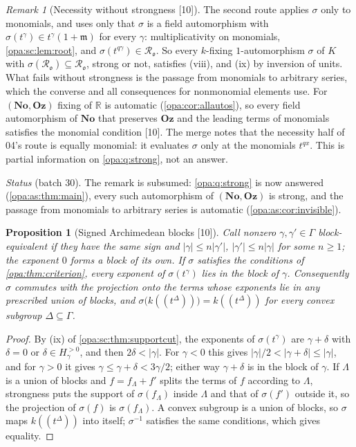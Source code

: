 \documentclass[11pt,oneside]{article}
\numberwithin{equation}{section}
\newtheorem{proposition}[proposition]{Proposition}
\theoremstyle{definition}
\theoremstyle{remark}
\newtheorem{remark}[remark]{Remark}
\newcommand{\No}{\mathbf{No}}
\newcommand{\Oz}{\mathbf{Oz}}
\newcommand{\R}{\mathbb R}
\newcommand{\oo}{\mathfrak o}
\newcommand{\Ro}{\mathcal R_{\oo}}
\newcommand{\mm}{\mathfrak m}
\newcommand{\Hahn}[2]{#1((t^{#2}))}
\newcommand{\src}[1]{\textup{\textsf{\small[#1]}}}
\begin{document}
\begin{remark}[Necessity without strongness \src{10}]\label{opa:sc:rem:nonstrong}
The second route applies $\sigma$ only to monomials, and uses only that $\sigma$
is a field automorphism with $\sigma(t^\gamma)\in t^\gamma(1+\mm)$ for every
$\gamma$: multiplicativity on monomials, \cref{opa:sc:lem:root}, and
$\sigma(t^{q\gamma})\in\Ro$. So every $k$-fixing $1$-automorphism $\sigma$ of $K$
with $\sigma(\Ro)\subseteq\Ro$, strong or not, satisfies (viii), and (ix) by
inversion of units. What fails without strongness is
the passage from monomials to arbitrary series, which the converse and all
consequences for nonmonomial elements use. For $(\No,\Oz)$ fixing of $\R$ is
automatic (\cref{opa:cor:allautos}), so every field automorphism of $\No$ that
preserves $\Oz$ and the leading terms of monomials satisfies the monomial
condition \src{10}. The merge notes that the necessity half of 04's route is
equally monomial: it evaluates $\sigma$ only at the monomials $t^{qx}$. This is
partial information on \cref{opa:q:strong}, not an answer.
\end{remark}

\emph{Status} (batch 30). The remark is subsumed: \cref{opa:q:strong} is now
answered (\cref{opa:as:thm:main}), every such automorphism of $(\No,\Oz)$ is
strong, and the passage from monomials to arbitrary series is automatic
(\cref{opa:as:cor:invisible}).

\begin{proposition}[Signed Archimedean blocks \src{10}]\label{opa:sc:prop:blocks}
Call nonzero $\gamma,\gamma'\in\Gamma$ \emph{block-equivalent} if they have the
same sign and $|\gamma|\le n|\gamma'|$, $|\gamma'|\le n|\gamma|$ for some $n\ge1$;
the exponent $0$ forms a block of its own. If $\sigma$ satisfies the conditions
of \cref{opa:thm:criterion}, every exponent of $\sigma(t^\gamma)$ lies in the block
of $\gamma$. Consequently $\sigma$ commutes with the projection onto the terms
whose exponents lie in any prescribed union of blocks, and
$\sigma\bigl(\Hahn k\Delta\bigr)=\Hahn k\Delta$ for every convex subgroup
$\Delta\subseteq\Gamma$.
\end{proposition}
\begin{proof}
By (ix) of \cref{opa:sc:thm:supportcut}, the exponents of $\sigma(t^\gamma)$
are $\gamma+\delta$ with $\delta=0$ or
$\delta\in H_\gamma^{>0}$, and then $2\delta<|\gamma|$. For $\gamma<0$ this gives
$|\gamma|/2<|\gamma+\delta|\le|\gamma|$, and for $\gamma>0$ it gives
$\gamma\le\gamma+\delta<3\gamma/2$; either way $\gamma+\delta$ is in the block of
$\gamma$. If $\Lambda$ is a union of blocks and $f=f_\Lambda+f'$ splits the terms of
$f$ according to $\Lambda$, strongness puts the support of $\sigma(f_\Lambda)$ inside
$\Lambda$ and that of $\sigma(f')$ outside it, so the projection of $\sigma(f)$ is
$\sigma(f_\Lambda)$. A
convex subgroup is a union of blocks, so $\sigma$ maps $\Hahn k\Delta$ into itself;
$\sigma^{-1}$ satisfies the same conditions, which gives equality.
\end{proof}
\end{document}
